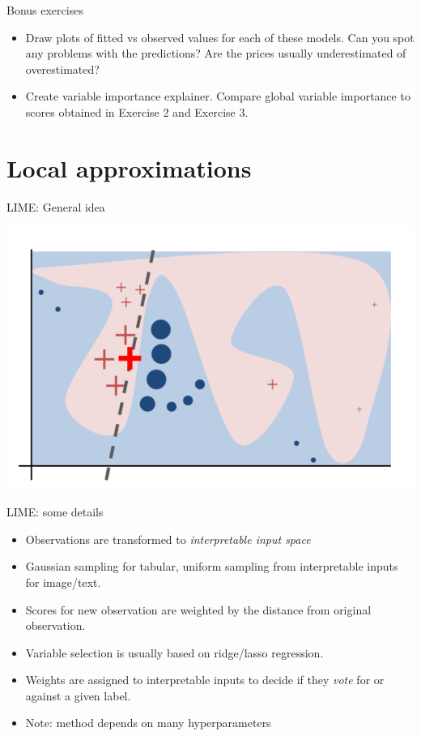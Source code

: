 \documentclass[xcolor={dvipsnames}]{beamer}
\begin{document}
\begin{frame}{Bonus exercises}
	\begin{itemize}
		\item Draw plots of fitted vs observed values for each of these models. Can you spot any problems with the predictions? Are the prices usually underestimated of overestimated?
		\item Create variable importance explainer. Compare global variable importance to scores obtained in Exercise 2 and Exercise 3.
	\end{itemize}	
	
\end{frame}

\section{Local approximations}

\begin{frame}{LIME: General idea}
	\begin{center}
\includegraphics[scale=0.4]{ilustracje_erum/lime_intuition.png}		
	\end{center}
\end{frame}

\begin{frame}{LIME: some details}
	\begin{itemize}
\item Observations are transformed to \textit{interpretable input space}

\item Gaussian sampling for tabular, uniform sampling from interpretable inputs for image/text.

\item Scores for new observation are weighted by the distance from original observation.

\item Variable selection is usually based on ridge/lasso regression.

\item Weights are assigned to interpretable inputs to decide if they \textit{vote} for or against a given label.

\item Note: method depends on many hyperparameters
	\end{itemize}
\end{frame}
\end{document}
